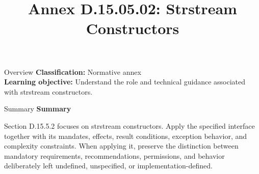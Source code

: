 \documentclass[10pt,letterpaper]{article}
\title{Annex D.15.05.02: Strstream Constructors}
\author{}
\date{}
\begin{document}
\maketitle
\begin{CornellOverviewBox}{Overview}
\textbf{Classification:} Normative annex\\[2pt]
\textbf{Learning objective:} Understand the role and technical guidance associated with strstream constructors.
\end{CornellOverviewBox}\begin{CornellSummaryBox}{Summary}
{\sffamily\bfseries\color{Accent} Summary}\par\vspace{3pt}Section D.15.5.2 focuses on strstream constructors. Apply the specified interface together with its mandates, effects, result conditions, exception behavior, and complexity constraints. When applying it, preserve the distinction between mandatory requirements, recommendations, permissions, and behavior deliberately left undefined, unspecified, or implementation-defined.
\end{CornellSummaryBox}
\end{document}
